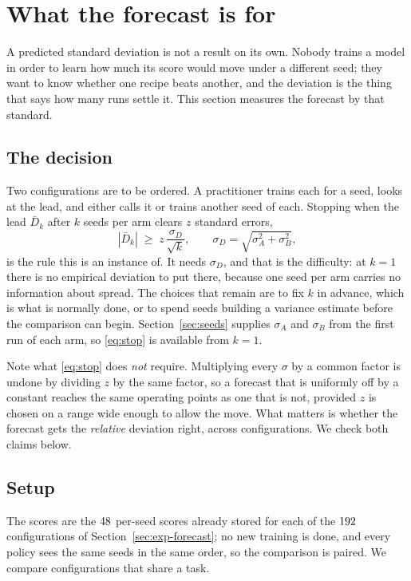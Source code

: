 \section{What the forecast is for}
\label{sec:sizing}

A predicted standard deviation is not a result on its own. Nobody trains a model in order to learn
how much its score would move under a different seed; they want to know whether one recipe beats
another, and the deviation is the thing that says how many runs settle it. This section measures
the forecast by that standard.

\subsection{The decision}

Two configurations are to be ordered. A practitioner trains each for a seed, looks at the lead,
and either calls it or trains another seed of each. Stopping when the lead $\bar D_k$ after $k$
seeds per arm clears $z$ standard errors,
\begin{equation}
  \label{eq:stop}
  |\bar D_k| \;\ge\; z\,\frac{\sigma_D}{\sqrt{k}},
  \qquad
  \sigma_D=\sqrt{\sigma_A^2+\sigma_B^2},
\end{equation}
is the rule this is an instance of. It needs $\sigma_D$, and that is the difficulty: at $k=1$
there is no empirical deviation to put there, because one seed per arm carries no information
about spread. The choices that remain are to fix $k$ in advance, which is what is normally done, or
to spend seeds building a variance estimate before the comparison can begin. Section~\ref{sec:seeds}
supplies $\sigma_A$ and $\sigma_B$ from the first run of each arm, so \eqref{eq:stop} is available
from $k=1$.

Note what \eqref{eq:stop} does \emph{not} require. Multiplying every $\sigma$ by a common factor is
undone by dividing $z$ by the same factor, so a forecast that is uniformly off by a constant
reaches the same operating points as one that is not, provided $z$ is chosen on a range wide enough
to allow the move. What matters is whether the forecast gets the \emph{relative} deviation right,
across configurations. We check both claims below.

\subsection{Setup}

The scores are the $48$ per-seed scores already stored for each of the
$192$ configurations of Section~\ref{sec:exp-forecast}; no new training is done, and every
policy sees the same seeds in the same order, so the comparison is paired. We compare
configurations that share a task.

